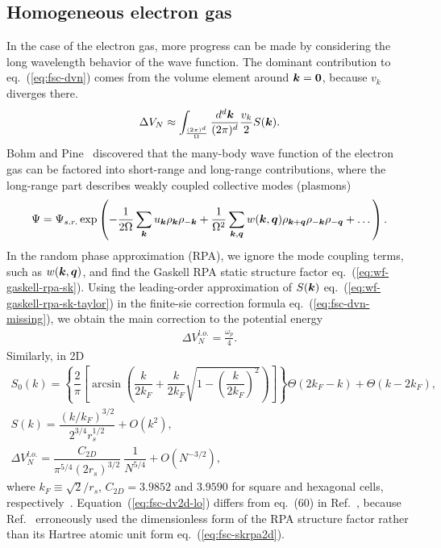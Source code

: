 \subsection{Homogeneous electron gas}
In the case of the electron gas, more progress can be made by considering the long wavelength behavior of the wave function. The dominant contribution to eq.~(\ref{eq:fsc-dvn}) comes from the volume element around $\boldsymbol{k}=\boldsymbol{0}$, because $v_k$ diverges there.
\begin{align} \label{eq:fsc-dvn-missing}
\Delta V_N \approx \int_{\frac{(2\pi)^d}{\Omega}} \dfrac{d^d\boldsymbol{k}}{(2\pi)^d} \frac{v_k}{2}S(\boldsymbol{k}).
\end{align}
Bohm and Pine~\cite{Bohm1953} discovered that the many-body wave function of the electron gas can be factored into short-range and long-range contributions, where the long-range part describes weakly coupled collective modes (plasmons)~\cite{Chiesa2007,Holzmann2016}
\begin{align} \label{eq:fsc-rpa-wf}
\Psi = \Psi_{s.r.} \exp\left(
-\frac{1}{2\Omega} \sum\limits_{\boldsymbol{k}} u_{\boldsymbol{k}} \rho_{\boldsymbol{k}} \rho_{-\boldsymbol{k}} + \frac{1}{\Omega^2}\sum\limits_{\boldsymbol{k},\boldsymbol{q}} w(\boldsymbol{k}, \boldsymbol{q}) \rho_{\boldsymbol{k}+\boldsymbol{q}}\rho_{-\boldsymbol{k}}\rho_{-\boldsymbol{q}}+\dots
\right).
\end{align}
In the random phase approximation (RPA), we ignore the mode coupling terms, such as $w(\boldsymbol{k},\boldsymbol{q})$, and find the Gaskell RPA static structure factor eq.~(\ref{eq:wf-gaskell-rpa-sk}).
Using the leading-order approximation of $S(\boldsymbol{k})$ eq.~(\ref{eq:wf-gaskell-rpa-sk-taylor}) in the finite-sie correction formula eq.~(\ref{eq:fsc-dvn-missing}), we obtain the main correction to the potential energy
\begin{align}
\Delta V_N^{l.o.} = \frac{\omega_p}{4}.
\end{align}
Similarly, in 2D~\cite{Gori-Giorgi2004}
\begin{align}
S_0(k) = \left\{
\dfrac{2}{\pi}\left[
\arcsin\left(\dfrac{k}{2k_F}+\dfrac{k}{2k_F}\sqrt{1-\left(\dfrac{k}{2k_F}\right)^2}\right)
\right]\right\} \Theta(2k_F-k) + \Theta(k-2k_F), \\
S(k) = \dfrac{(k/k_F)^{3/2}}{2^{3/4}r_s^{1/2}} + O(k^2), \label{eq:fsc-skrpa2d}\\
\Delta V_N^{l.o.} = \dfrac{C_{2D}}{\pi^{5/4} (2r_s)^{3/2}}~\dfrac{1}{N^{5/4}} + O(N^{-3/2}), \label{eq:fsc-dv2d-lo}
\end{align}
where $k_F\equiv\sqrt{2}/r_s$, $C_{2D}=3.9852$ and $3.9590$ for square and hexagonal cells, respectively~\cite{Drummond2008}. Equation~(\ref{eq:fsc-dv2d-lo}) differs from eq.~(60) in Ref.~\cite{Drummond2008}, because Ref.~\cite{Drummond2008} erroneously used the dimensionless form of the RPA structure factor rather than its Hartree atomic unit form eq.~(\ref{eq:fsc-skrpa2d}).

